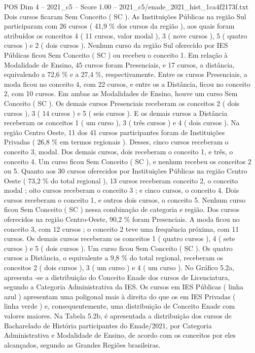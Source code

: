 \begin{textsample}{POS Dim 4 – 2021\_c5 – Score 1.00 – 2021\_c5/enade\_2021\_hist\_1ca4f2173f.txt}
Dois cursos ficaram Sem Conceito ( SC ).
As Instituições Públicas na região Sul participaram com 26 cursos ( 41,9 \% dos cursos da região ), aos quais foram atribuídos os conceitos 4 ( 11 cursos, valor modal ), 3 ( nove cursos ), 5 ( quatro cursos ) e 2 ( dois cursos ).
Nenhum curso da região Sul oferecido por IES Públicas ficou Sem Conceito ( SC ) ou recebeu o conceito 1.
Em relação à Modalidade de Ensino, 45 cursos foram Presenciais, e 17 cursos, a distância, equivalendo a 72,6 \% e a 27,4 \%, respectivamente.
Entre os cursos Presenciais, a moda ficou no conceito 4, com 22 cursos, e entre os a Distância, ficou no conceito 2, com 10 cursos.
Em ambas as Modalidades de Ensino, houve um curso Sem Conceito ( SC ).
Os demais cursos Presenciais receberam os conceitos 2 ( dois cursos ), 3 ( 14 cursos ) e 5 ( seis cursos ).
E os demais cursos a Distância receberam os conceitos 1 ( um curso ), 3 ( três cursos ) e 4 ( dois cursos ).
Na região Centro Oeste, 11 dos 41 cursos participantes foram de Instituições Privadas ( 26,8 \% em termos regionais ).
Desses, cinco cursos receberam o conceito 3, modal.
Dos demais cursos, dois receberam o conceito 1, e três, o conceito 4.
Um curso ficou Sem Conceito ( SC ), e nenhum recebeu os conceitos 2 ou 5.
Quanto aos 30 cursos oferecidos por Instituições Públicas na região Centro Oeste ( 73,2 \% do total regional ), 13 cursos receberam conceito 2, o conceito modal ; oito cursos receberam o conceito 3 ; e cinco cursos, o conceito 4.
Dois cursos receberam o conceito 1, e outros dois cursos, o conceito 5.
Nenhum curso ficou Sem Conceito ( SC ) nessa combinação de categoria e região.
Dos cursos oferecidos na região Centro-Oeste, 90,2 \% foram Presenciais.
A moda ficou no conceito 3, com 12 cursos ; o conceito 2 teve uma frequência próxima, com 11 cursos.
Os demais cursos receberam os conceitos 1 ( quatro cursos ), 4 ( sete cursos ) e 5 ( dois cursos ).
Um curso ficou Sem Conceito ( SC ).
Os quatro cursos a Distância, o equivalente a 9,8 \% do total regional, receberam os conceitos 2 ( dois cursos ), 3 ( um curso ) e 4 ( um curso ).
No Gráfico 5.2a, apresenta -se a distribuição do Conceito Enade dos cursos de Licenciatura, segundo a Categoria Administrativa da IES.
Os cursos em IES Públicas ( linha azul ) apresentam uma poligonal mais à direita do que os em IES Privadas ( linha verde ) e, consequentemente, uma distribuição de Conceito Enade com valores maiores.
Na Tabela 5.2b, é apresentada a distribuição dos cursos de Bacharelado de História participantes do Enade/2021, por Categoria Administrativa e Modalidade de Ensino, de acordo com os conceitos por eles alcançados, segundo as Grandes Regiões brasileiras.

\end{textsample}
